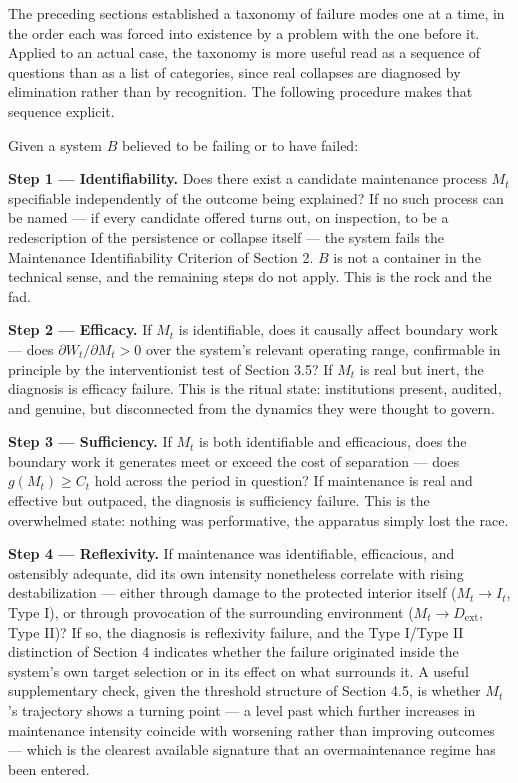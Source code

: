 \documentclass[11pt]{article}
\theoremstyle{plain}
\begin{document}
The preceding sections established a taxonomy of failure modes one at a time, in the order each was forced into existence by a problem with the one before it. Applied to an actual case, the taxonomy is more useful read as a sequence of questions than as a list of categories, since real collapses are diagnosed by elimination rather than by recognition. The following procedure makes that sequence explicit.

Given a system \(B\) believed to be failing or to have failed:

\textbf{Step 1 --- Identifiability.} Does there exist a candidate maintenance process \(M_t\) specifiable independently of the outcome being explained? If no such process can be named --- if every candidate offered turns out, on inspection, to be a redescription of the persistence or collapse itself --- the system fails the Maintenance Identifiability Criterion of Section 2. \(B\) is not a container in the technical sense, and the remaining steps do not apply. This is the rock and the fad.

\textbf{Step 2 --- Efficacy.} If \(M_t\) is identifiable, does it causally affect boundary work --- does \(\partial W_t/\partial M_t > 0\) over the system's relevant operating range, confirmable in principle by the interventionist test of Section 3.5? If \(M_t\) is real but inert, the diagnosis is efficacy failure. This is the ritual state: institutions present, audited, and genuine, but disconnected from the dynamics they were thought to govern.

\textbf{Step 3 --- Sufficiency.} If \(M_t\) is both identifiable and efficacious, does the boundary work it generates meet or exceed the cost of separation --- does \(g(M_t) \geq C_t\) hold across the period in question? If maintenance is real and effective but outpaced, the diagnosis is sufficiency failure. This is the overwhelmed state: nothing was performative, the apparatus simply lost the race.

\textbf{Step 4 --- Reflexivity.} If maintenance was identifiable, efficacious, and ostensibly adequate, did its own intensity nonetheless correlate with rising destabilization --- either through damage to the protected interior itself (\(M_t \to I_t\), Type I), or through provocation of the surrounding environment (\(M_t \to D_{\mathrm{ext}}\), Type II)? If so, the diagnosis is reflexivity failure, and the Type I/Type II distinction of Section 4 indicates whether the failure originated inside the system's own target selection or in its effect on what surrounds it. A useful supplementary check, given the threshold structure of Section 4.5, is whether \(M_t\)'s trajectory shows a turning point --- a level past which further increases in maintenance intensity coincide with worsening rather than improving outcomes --- which is the clearest available signature that an overmaintenance regime has been entered.
\end{document}
